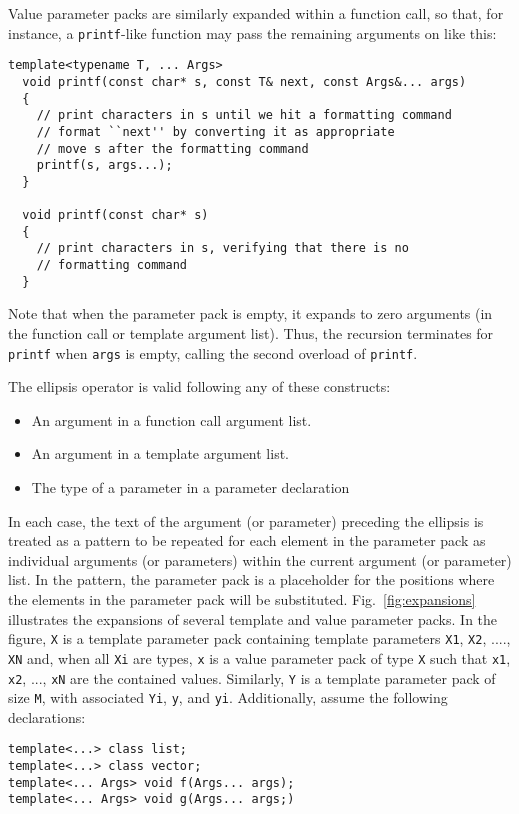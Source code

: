 \documentclass{article}
\begin{document}
Value parameter packs are similarly expanded within a function call,
so that, for instance, a {\tt printf}-like function may pass the
remaining arguments on like this:
\begin{verbatim}
template<typename T, ... Args>
  void printf(const char* s, const T& next, const Args&... args)
  {
    // print characters in s until we hit a formatting command
    // format ``next'' by converting it as appropriate
    // move s after the formatting command
    printf(s, args...); 
  }

  void printf(const char* s)
  {
    // print characters in s, verifying that there is no 
    // formatting command
  }
\end{verbatim}

Note that when the parameter pack is empty, it expands to zero
arguments (in the function call or template argument list). Thus, the
recursion terminates for \texttt{printf} when {\tt args} is empty,
calling the second overload of \texttt{printf}.

The ellipsis operator is valid following any of these constructs:
\begin{itemize}
\item An argument in a function call argument list.
\item An argument in a template argument list.
\item The type of a parameter in a parameter declaration
\end{itemize}

In each case, the text of the argument (or parameter) preceding the
ellipsis is treated as a pattern to be repeated for each element in
the parameter pack as individual arguments (or parameters) within the
current argument (or parameter) list. In the pattern, the parameter
pack is a placeholder for the positions where the elements in the
parameter pack will be substituted. Fig.~\ref{fig:expansions}
illustrates the expansions of several template and value parameter
packs. In the figure, \texttt{X} is a template parameter pack
containing template parameters \texttt{X1}, \texttt{X2}, ....,
\texttt{XN} and, when all \texttt{Xi} are types, \texttt{x} is a value
parameter pack of type \texttt{X} such that \texttt{x1}, \texttt{x2},
..., \texttt{xN} are the contained values. Similarly, \texttt{Y} is a
template parameter pack of size \texttt{M}, with associated
\texttt{Yi}, \texttt{y}, and \texttt{yi}. Additionally, assume the
following declarations:
\begin{verbatim}
template<...> class list;
template<...> class vector;
template<... Args> void f(Args... args);
template<... Args> void g(Args... args;)
\end{verbatim}
\end{document}
